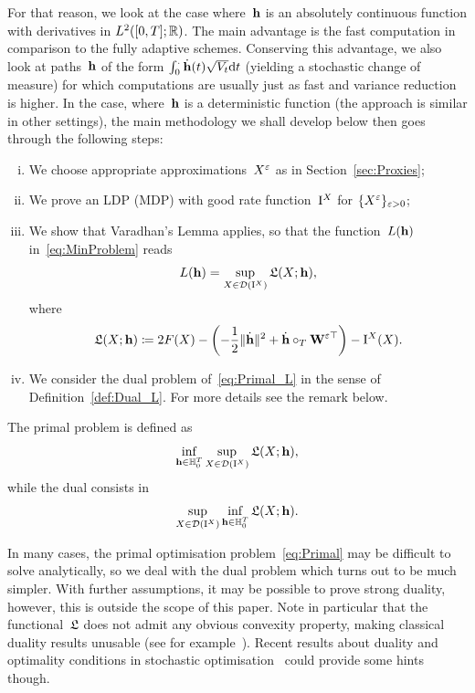 For that reason, we look at the case where~$\boldsymbol{\mathrm{h}}$ is an absolutely continuous function with derivatives in $L^2([0, T]; \mathbb{R})$.
The main advantage is the fast computation in comparison to the fully adaptive schemes. 
Conserving this advantage, we also look at paths~$\boldsymbol{\mathrm{h}}$ of the form $\int_0^.\dot{\boldsymbol{\mathrm{h}}}(t)\sqrt{V_t}\mathrm{d} t$ (yielding a stochastic change of measure) for which computations are usually just as fast and variance reduction is higher. 
In the case, where~$\boldsymbol{\mathrm{h}}$ is a deterministic function 
(the approach is similar in other settings), 
the main methodology we shall develop below then goes through the following steps:
\begin{enumerate}[i)]
    \item We choose appropriate approximations~$X^{\varepsilon}$ as in Section~\ref{sec:Proxies};
    \item We prove an LDP (MDP) with good rate function~$\mathrm{I}^{X}$ for $\{X^\varepsilon\}_{\varepsilon>0}$;
    \item We show that Varadhan's Lemma applies, 
    so that the function~$L(\boldsymbol{\mathrm{h}})$ in~\eqref{eq:MinProblem} reads
    \begin{equation}\label{eq:Primal_L}
    L(\boldsymbol{\mathrm{h}}) = \sup_{X\in \mathcal{D}(\mathrm{I}^{X})} \mathfrak{L}(X;\boldsymbol{\mathrm{h}}),
    \end{equation}
where
\begin{equation}\label{eq:TargetFunc}
\mathfrak{L}(X;\boldsymbol{\mathrm{h}}) \coloneqq 2F(X) - \left(-\frac{1}{2}\|\dot{\boldsymbol{\mathrm{h}}}\|^2 + \dot{\boldsymbol{\mathrm{h}}}\circ_T\boldsymbol{\mathrm{W}}^{\varepsilon\top}\right) - \mathrm{I}^{X}(X).
    \end{equation}
    \item We consider the dual problem of~\eqref{eq:Primal_L} in the sense of Definition~\ref{def:Dual_L}. For more details see the remark below.
\end{enumerate}
\begin{definition}\label{def:Dual_L}
The primal problem is defined as
\begin{equation}\label{eq:Primal}
\inf_{\boldsymbol{\mathrm{h}}\in\mathbb{H}^T_0} \sup_{X\in \mathcal{D}(\mathrm{I}^{X})}\mathfrak{L}(X;\boldsymbol{\mathrm{h}}),
\end{equation}
while the dual consists in
\begin{equation}\label{eq:Dual}
\sup_{X\in \mathcal{D}(\mathrm{I}^{X})} \inf_{\boldsymbol{\mathrm{h}}\in\mathbb{H}^T_0} \mathfrak{L}(X;\boldsymbol{\mathrm{h}}).
\end{equation}
\end{definition}
\begin{remark}
In many cases, the primal optimisation problem~\eqref{eq:Primal} may be difficult to solve analytically, so we deal with the dual problem which turns out to be much simpler.
With further assumptions, it may be possible to prove strong duality, however, this is outside the scope of this paper.
Note in particular that the functional~$\mathfrak{L}$
does not admit any obvious convexity property, making classical duality results unusable (see for example~\cite[Section~4]{Rockafellar1974ConjugateOptimization}).
Recent results about duality and optimality conditions in stochastic optimisation~\cite{Biagini2018DualityFinance, Pennanen2011ConvexFinance} could provide some hints though.
\end{remark}

